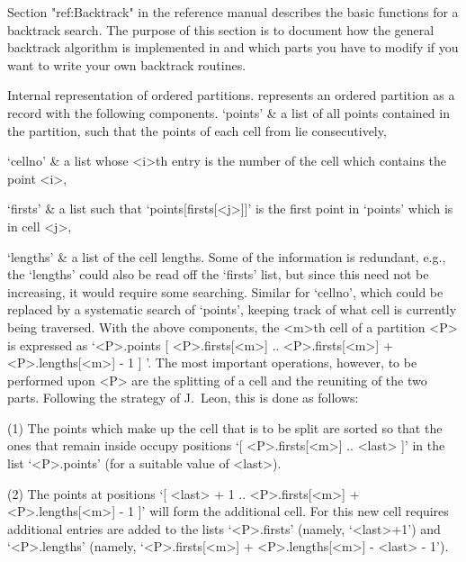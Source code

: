 
\begingroup%
\def\R{{\cal R}} \def\I{{\cal I}}%

Section "ref:Backtrack" in the reference manual describes the basic
functions for a backtrack search. The purpose of
this section  is  to document  how  the general   backtrack algorithm  is
implemented in {\GAP} and which  parts you have to modify  if you want to
write your own backtrack routines.

\medskip
{}%
{\bsf   Internal   representation  of  ordered  partitions.}\quad  {\GAP}
represents an   ordered   partition  as a  record    with   the following
components.
\beginitems
`points' &
        a list  of all points contained in  the  partition, such that the
        points of each cell from lie consecutively,

`cellno' &
        a list whose <i>th entry is the number of the cell which contains
        the point <i>,

`firsts' &
        a list  such that  `points[firsts[<j>]]'  is  the first point  in
        `points' which is in cell <j>,

`lengths' &
        a list of the  cell lengths.
\enditems
Some of the information is  redundant, e.g., the  `lengths' could also be
read off the `firsts' list,  but since this   need not be increasing,  it
would    require some searching. Similar  for    `cellno', which could be
replaced by a systematic search  of `points', keeping  track of what cell
is currently being  traversed. With the above  components, the <m>th cell
of   a partition <P> is   expressed as `<P>.points{  [ <P>.firsts[<m>] ..
<P>.firsts[<m>] +  <P>.lengths[<m>]  -  1  ]   }'. The   most   important
operations, however, to be performed upon <P> are the splitting of a cell
and the reuniting  of the two parts. Following  the strategy  of J.~Leon,
this is done as follows:

(1) The points which make up the cell that  is to be  split are sorted so
that the ones  that remain inside occupy  positions `[ <P>.firsts[<m>] ..
<last> ]' in the list `<P>.points' (for a suitable value of <last>).

(2) The  points   at positions  `[   <last>  + 1 ..    <P>.firsts[<m>]  +
<P>.lengths[<m>] - 1 ]' will form the  additional cell. For this new cell
requires additional entries are  added to the lists `<P>.firsts' (namely,
`<last>+1')     and    `<P>.lengths'   (namely,      `<P>.firsts[<m>]   +
<P>.lengths[<m>] - <last> - 1').

